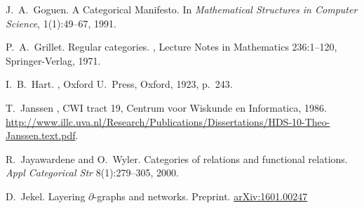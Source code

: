 \begin{thebibliography}{RSW00}
    J.\ A.\ Goguen. 
    \newblock A Categorical Manifesto. 
    \newblock In {\em Mathematical Structures in Computer Science}, 1(1):49--67,
    1991.


    P.\ A.\ Grillet.
    \newblock Regular categories.
    , Lecture Notes in
    Mathematics 236:1--120, Springer-Verlag, 1971.


    I.\ B.\ Hart.
    , Oxford U.\ Press, Oxford, 1923, p.\ 243.

    
    
    T.\ Janssen
    , CWI tract 19, Centrum voor
    Wiskunde en Informatica, 1986.
    \newblock
    \href{http://www.illc.uva.nl/Research/Publications/Dissertations/HDS-10-Theo-Janssen.text.pdf}{http://www.illc.uva.nl/Research/Publications/Dissertations/HDS-10-Theo-Janssen.text.pdf}.
    
    R.\ Jayawardene and O.\ Wyler.
    \newblock Categories of relations and functional relations.
    \newblock \emph{Appl Categorical Str} 8(1):279--305, 2000.
    
    D.\ Jekel.
    \newblock Layering $\partial$-graphs and networks. 
    \newblock Preprint.
    \newblock \href{http://arxiv.org/abs/1601.00247}{arXiv:1601.00247}


\end{thebibliography}
